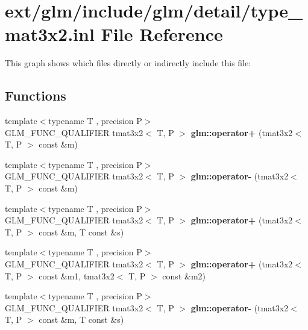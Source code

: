 \hypertarget{type__mat3x2_8inl}{\section{ext/glm/include/glm/detail/type\-\_\-mat3x2.inl File Reference}
\label{type__mat3x2_8inl}
}
This graph shows which files directly or indirectly include this file\-:
\subsection*{Functions}
\begin{DoxyCompactItemize}
\item 
\hypertarget{namespaceglm_a1214e20945308ab87fab8459c686caa5}{{\footnotesize template$<$typename T , precision P$>$ }\\G\-L\-M\-\_\-\-F\-U\-N\-C\-\_\-\-Q\-U\-A\-L\-I\-F\-I\-E\-R tmat3x2$<$ T, P $>$ {\bfseries glm\-::operator+} (tmat3x2$<$ T, P $>$ const \&m)}\label{namespaceglm_a1214e20945308ab87fab8459c686caa5}

\item 
\hypertarget{namespaceglm_a004c944e52b621d162e27b2923ff5d8d}{{\footnotesize template$<$typename T , precision P$>$ }\\G\-L\-M\-\_\-\-F\-U\-N\-C\-\_\-\-Q\-U\-A\-L\-I\-F\-I\-E\-R tmat3x2$<$ T, P $>$ {\bfseries glm\-::operator-\/} (tmat3x2$<$ T, P $>$ const \&m)}\label{namespaceglm_a004c944e52b621d162e27b2923ff5d8d}

\item 
\hypertarget{namespaceglm_a9e5889d192060bf4786927aceabf95ef}{{\footnotesize template$<$typename T , precision P$>$ }\\G\-L\-M\-\_\-\-F\-U\-N\-C\-\_\-\-Q\-U\-A\-L\-I\-F\-I\-E\-R tmat3x2$<$ T, P $>$ {\bfseries glm\-::operator+} (tmat3x2$<$ T, P $>$ const \&m, T const \&s)}\label{namespaceglm_a9e5889d192060bf4786927aceabf95ef}

\item 
\hypertarget{namespaceglm_a16ca58b9b3b4625e4b708c8a91df3a71}{{\footnotesize template$<$typename T , precision P$>$ }\\G\-L\-M\-\_\-\-F\-U\-N\-C\-\_\-\-Q\-U\-A\-L\-I\-F\-I\-E\-R tmat3x2$<$ T, P $>$ {\bfseries glm\-::operator+} (tmat3x2$<$ T, P $>$ const \&m1, tmat3x2$<$ T, P $>$ const \&m2)}\label{namespaceglm_a16ca58b9b3b4625e4b708c8a91df3a71}

\item 
\hypertarget{namespaceglm_a8243cba905c1840613c1b277b751759c}{{\footnotesize template$<$typename T , precision P$>$ }\\G\-L\-M\-\_\-\-F\-U\-N\-C\-\_\-\-Q\-U\-A\-L\-I\-F\-I\-E\-R tmat3x2$<$ T, P $>$ {\bfseries glm\-::operator-\/} (tmat3x2$<$ T, P $>$ const \&m, T const \&s)}\label{namespaceglm_a8243cba905c1840613c1b277b751759c}


\end{DoxyCompactItemize}
